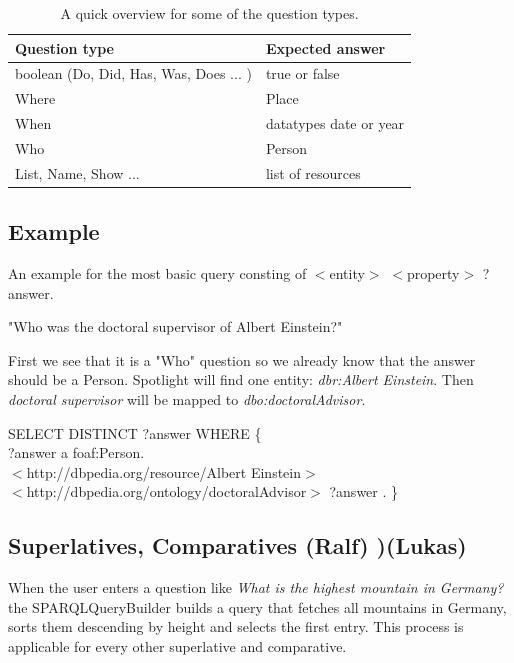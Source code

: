 \documentclass[runningheads]{llncs}
\begin{document}
\begin{table}
	\caption{A quick overview for some of the question types.}\label{tab1}
	\begin{center}
		\begin{tabularx}{\textwidth}{@{}|Y|Y|@{}}
			\hline
			\textbf{Question type} &  \textbf{Expected answer} \\
			\hline
			boolean (Do, Did, Has, Was, Does ... ) &  true or false \\
			\hline
			Where &  Place \\
			\hline
			When &  datatypes date or year \\
			\hline
			Who &  Person \\
			\hline
			List, Name, Show ... &  list of resources \\
			\hline
		\end{tabularx}
	\end{center}
\end{table}

\subsection{Example}
An example for the most basic query consting of $<$entity$>$ $<$property$>$ ?answer.
\begin{example}
	"Who was the doctoral supervisor of Albert Einstein?"\end{example}
First we see that it is a "Who" question so we already know that the answer should be a Person.
Spotlight will find one entity: \textit{dbr:Albert Einstein}. Then \textit{doctoral supervisor} will be mapped to \textit{dbo:doctoralAdvisor}.

\begin{example}
	SELECT DISTINCT ?answer WHERE \{ \\
	\tab[1.8cm] ?answer a foaf:Person. \\
	\tab[1.8cm] $<$http://dbpedia.org/resource/Albert Einstein$>$ \\
	\tab[1.8cm] $<$http://dbpedia.org/ontology/doctoralAdvisor$>$ ?answer . \} \end{example}



\subsection{Superlatives, Comparatives (Ralf) )(Lukas)} 

When the user enters a question like \emph{What is the highest mountain in Germany?}  the SPARQLQueryBuilder builds a query that fetches all mountains in Germany, sorts them descending by height and selects the first entry. This process is applicable for every other superlative and comparative. \\
\end{document}
